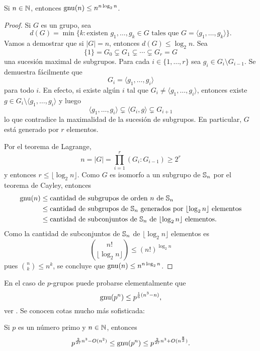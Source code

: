 \begin{theorem}
Si $n\in\mathbb{N}$, entonces $\operatorname{gnu}(n)\leq n^{n\log_2 n}$.
\end{theorem}

\begin{proof}
Si $G$ es un grupo, sea 
\[
d(G)=\min\{k:\text{existen $g_1,\dots,g_k\in G$ tales que $G=\langle g_1,\dots,g_k\rangle$}\}.
\]
Vamos a demostrar que si $|G|=n$, entonces $d(G)\leq\log_2 n$. Sea
\[
\{1\}=G_0\subsetneq G_1\subsetneq\cdots\subsetneq G_r=G
\]
una sucesión maximal de subgrupos. Para cada $i\in\{1,\dots,r\}$ sea
$g_i\in G_i\setminus G_{i-1}$. Se demuestra fácilmente
que 
\[
G_i=\langle g_1,\dots,g_i\rangle
\]
para todo $i$. 
En efecto, si existe algún $i$ tal que $G_i\ne\langle g_1,\dots,g_i\rangle$, entonces
existe $g\in G_i\setminus\langle g_1,\dots,g_i\rangle$ y luego
\[
\langle g_1,\dots,g_i\rangle\subsetneq \langle G_i,g\rangle\subsetneq G_{i+1}
\]
lo que contradice la maximalidad de la sucesión de subgrupos. En particular, $G$ está generado 
por $r$ elementos.

Por el teorema de Lagrange, 
\[
n=|G|=\prod_{i=1}^r(G_i:G_{i-1})\geq 2^r
\]
y entonces $r\leq\lfloor \log_2 n\rfloor$. 
Como $G$ es isomorfo a un 
subgrupo de $\mathbb{S}_n$ por el teorema de Cayley, entonces 
\begin{align*}
\operatorname{gnu}(n)
&\leq\text{cantidad de subgrupos de orden $n$ de $\mathbb{S}_n$}\\
&\leq\text{cantidad de subgrupos de $\mathbb{S}_n$ generados por $\lfloor\log_2n\rfloor$ elementos}\\
&\leq\text{cantidad de subconjuntos de $\mathbb{S}_n$ de $\lfloor\log_2n\rfloor$ elementos}.
\end{align*}
Como la cantidad de subconjuntos de $\mathbb{S}_n$ de $\lfloor\log_2n\rfloor$ elementos
es
\[
\binom{n!}{\lfloor\log_2n\rfloor}\leq(n!)^{\log_2n}
\]
pues $\binom{n}{k}\leq n^k$, se concluye que $\operatorname{gnu}(n)\leq n^{n\log_2n}$. 
\end{proof}

En el caso de $p$-grupos puede probarse elementalmente que 
\[
\operatorname{gnu}(p^n)\leq p^{\frac16(n^3-n)},
\]
ver \cite[Theorem 5.1]{MR2382539}. Se conocen 
cotas mucho más sofisticada: 

\begin{theorem}
Si $p$ es un número primo y $n\in\mathbb{N}$, entonces 
\[
p^{\frac{2}{27}n^3-O(n^2)}\leq\operatorname{gnu}(p^n)\leq p^{\frac{2}{27}n^3+O(n^{\frac{8}{3}})}.
\]
\end{theorem}

